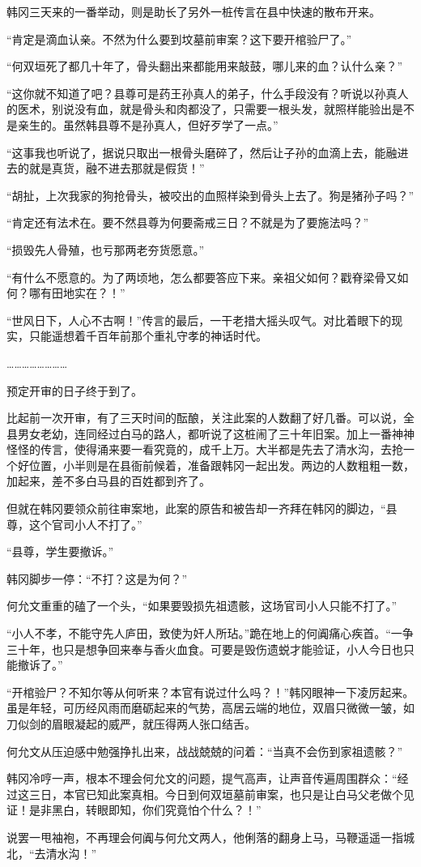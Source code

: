 韩冈三天来的一番举动，则是助长了另外一桩传言在县中快速的散布开来。

“肯定是滴血认亲。不然为什么要到坟墓前审案？这下要开棺验尸了。”

“何双垣死了都几十年了，骨头翻出来都能用来敲鼓，哪儿来的血？认什么亲？”

“这你就不知道了吧？县尊可是药王孙真人的弟子，什么手段没有？听说以孙真人的医术，别说没有血，就是骨头和肉都没了，只需要一根头发，就照样能验出是不是亲生的。虽然韩县尊不是孙真人，但好歹学了一点。”

“这事我也听说了，据说只取出一根骨头磨碎了，然后让子孙的血滴上去，能融进去的就是真货，融不进去那就是假货！”

“胡扯，上次我家的狗抢骨头，被咬出的血照样染到骨头上去了。狗是猪孙子吗？”

“肯定还有法术在。要不然县尊为何要斋戒三日？不就是为了要施法吗？”

“损毁先人骨殖，也亏那两老夯货愿意。”

“有什么不愿意的。为了两顷地，怎么都要答应下来。亲祖父如何？戳脊梁骨又如何？哪有田地实在？！”

“世风日下，人心不古啊！”传言的最后，一干老措大摇头叹气。对比着眼下的现实，只能遥想着千百年前那个重礼守孝的神话时代。

……………………

预定开审的日子终于到了。

比起前一次开审，有了三天时间的酝酿，关注此案的人数翻了好几番。可以说，全县男女老幼，连同经过白马的路人，都听说了这桩闹了三十年旧案。加上一番神神怪怪的传言，使得涌来要一看究竟的，成千上万。大半都是先去了清水沟，去抢一个好位置，小半则是在县衙前候着，准备跟韩冈一起出发。两边的人数粗粗一数，加起来，差不多白马县的百姓都到齐了。

但就在韩冈要领众前往审案地，此案的原告和被告却一齐拜在韩冈的脚边，“县尊，这个官司小人不打了。”

“县尊，学生要撤诉。”

韩冈脚步一停：“不打？这是为何？”

何允文重重的磕了一个头，“如果要毁损先祖遗骸，这场官司小人只能不打了。”

“小人不孝，不能守先人庐田，致使为奸人所玷。”跪在地上的何阗痛心疾首。“一争三十年，也只是想争回来奉与香火血食。可要是毁伤遗蜕才能验证，小人今日也只能撤诉了。”

“开棺验尸？不知尔等从何听来？本官有说过什么吗？！”韩冈眼神一下凌厉起来。虽是年轻，可历经风雨而磨砺起来的气势，高居云端的地位，双眉只微微一皱，如刀似剑的眉眼凝起的威严，就压得两人张口结舌。

何允文从压迫感中勉强挣扎出来，战战兢兢的问着：“当真不会伤到家祖遗骸？”

韩冈冷哼一声，根本不理会何允文的问题，提气高声，让声音传遍周围群众：“经过这三日，本官已知此案真相。今日到何双垣墓前审案，也只是让白马父老做个见证！是非黑白，转眼即知，你们究竟怕个什么？！”

说罢一甩袖袍，不再理会何阗与何允文两人，他俐落的翻身上马，马鞭遥遥一指城北，“去清水沟！”

